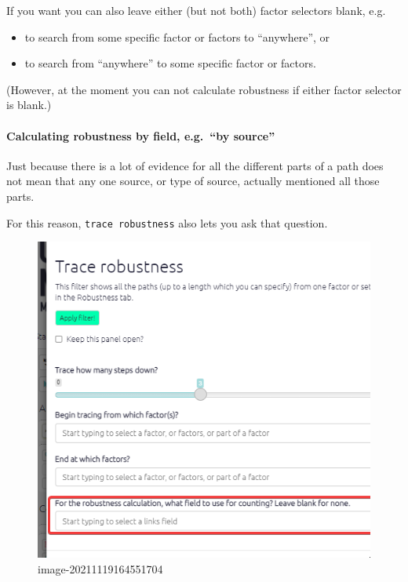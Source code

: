 \documentclass[
]{book}
\providecommand{\tightlist}{%
  \setlength{\itemsep}{0pt}\setlength{\parskip}{0pt}}
\begin{document}
If you want you can also leave either (but not both) factor selectors blank, e.g.

\begin{itemize}
\tightlist
\item
  to search from some specific factor or factors to ``anywhere'', or
\item
  to search from ``anywhere'' to some specific factor or factors.
\end{itemize}

(However, at the moment you can not calculate robustness if either factor selector is blank.)

\hypertarget{calculating-robustness-by-field-e.g.-by-source}{%
\paragraph{Calculating robustness by field, e.g.~``by source''}\label{calculating-robustness-by-field-e.g.-by-source}}

Just because there is a lot of evidence for all the different parts of a path does not mean that any one source, or type of source, actually mentioned all those parts.

For this reason, \texttt{trace\ robustness} also lets you ask that question.

\begin{figure}
\centering
\includegraphics{_assets/image-20211119164551704.png}
\caption{image-20211119164551704}
\end{figure}
\end{document}
